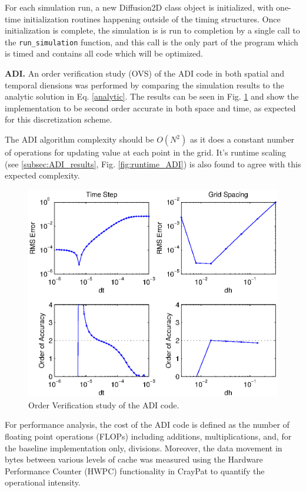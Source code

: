 \documentclass[letterpaper]{article}
\newcommand{\mypar}[1]{{\bf #1.}}
\begin{document}
For each simulation run, a new Diffusion2D class object is initialized, with one-time initialization routines happening outside of the timing structures. Once initialization is complete, the simulation is is run to completion by a single call to the {\tt run\_simulation} function, and this call is the only part of the program which is timed and contains all code which will be optimized. 

\mypar{ADI}
An order verification study (OVS) of the ADI code in both spatial and temporal diensions was performed by comparing the simulation results to the analytic solution in Eq. \eqref{analytic}. The results can be seen in Fig. \ref{fig:OVS_ADI} and show the implementation to be second order accurate in both space and time, as expected for this discretization scheme.

The ADI algorithm complexity should be $O(N^2)$ as it does a constant number of operations for updating value at each point in the grid. It's runtime scaling (see \ref{subsec:ADI_results}, Fig. \ref{fig:runtime_ADI}) is also found to agree with this expected complexity.

\begin{figure}\centering
  \includegraphics[width=\linewidth]{./plots/OVS_ADI_cropped.eps}
  \caption{Order Verification study of the ADI code.}
  \label{fig:OVS_ADI}
\end{figure}

For performance analysis, the cost of the ADI code is defined as the number of floating point operations (FLOPs) including additions, multiplications, and, for the baseline implementation only, divisions. Moreover, the data movement in bytes between various levels of cache was measured using the Hardware Performance Counter (HWPC) functionality in CrayPat to quantify the operational intensity.
\end{document}
